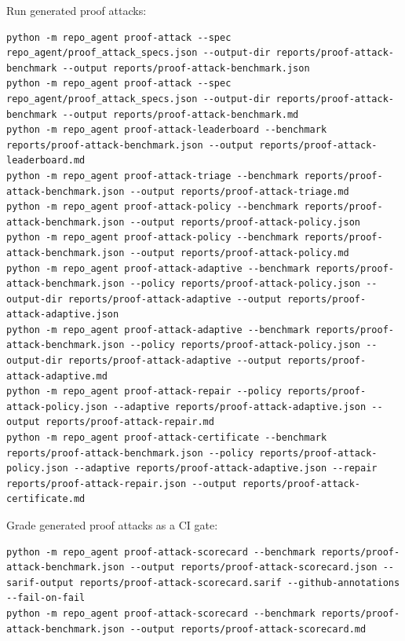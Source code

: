 \documentclass[UTF8,12pt,openany]{ctexbook}
\begin{document}
Run generated proof attacks:\par

\begin{lstlisting}
python -m repo_agent proof-attack --spec repo_agent/proof_attack_specs.json --output-dir reports/proof-attack-benchmark --output reports/proof-attack-benchmark.json
python -m repo_agent proof-attack --spec repo_agent/proof_attack_specs.json --output-dir reports/proof-attack-benchmark --output reports/proof-attack-benchmark.md
python -m repo_agent proof-attack-leaderboard --benchmark reports/proof-attack-benchmark.json --output reports/proof-attack-leaderboard.md
python -m repo_agent proof-attack-triage --benchmark reports/proof-attack-benchmark.json --output reports/proof-attack-triage.md
python -m repo_agent proof-attack-policy --benchmark reports/proof-attack-benchmark.json --output reports/proof-attack-policy.json
python -m repo_agent proof-attack-policy --benchmark reports/proof-attack-benchmark.json --output reports/proof-attack-policy.md
python -m repo_agent proof-attack-adaptive --benchmark reports/proof-attack-benchmark.json --policy reports/proof-attack-policy.json --output-dir reports/proof-attack-adaptive --output reports/proof-attack-adaptive.json
python -m repo_agent proof-attack-adaptive --benchmark reports/proof-attack-benchmark.json --policy reports/proof-attack-policy.json --output-dir reports/proof-attack-adaptive --output reports/proof-attack-adaptive.md
python -m repo_agent proof-attack-repair --policy reports/proof-attack-policy.json --adaptive reports/proof-attack-adaptive.json --output reports/proof-attack-repair.md
python -m repo_agent proof-attack-certificate --benchmark reports/proof-attack-benchmark.json --policy reports/proof-attack-policy.json --adaptive reports/proof-attack-adaptive.json --repair reports/proof-attack-repair.json --output reports/proof-attack-certificate.md
\end{lstlisting}

Grade generated proof attacks as a CI gate:\par

\begin{lstlisting}
python -m repo_agent proof-attack-scorecard --benchmark reports/proof-attack-benchmark.json --output reports/proof-attack-scorecard.json --sarif-output reports/proof-attack-scorecard.sarif --github-annotations --fail-on-fail
python -m repo_agent proof-attack-scorecard --benchmark reports/proof-attack-benchmark.json --output reports/proof-attack-scorecard.md
\end{lstlisting}
\end{document}
